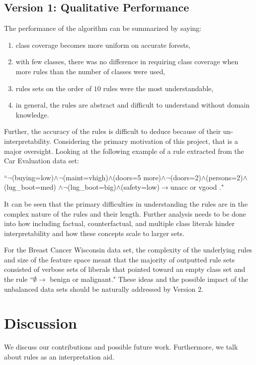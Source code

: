\documentclass[11pt]{article}
\begin{document}
\subsection{Version 1: Qualitative Performance}
The performance of the algorithm can be summarized by saying:
\begin{enumerate}
\item class coverage becomes more uniform on accurate forests,
\item with few classes, there was no difference in requiring class coverage when more rules than the number of classes were used, 
\item rules sets on the order of $10$ rules were the most understandable,
\item in general, the rules are abstract and difficult to understand without domain knowledge.
\end{enumerate}

Further, the accuracy of the rules is difficult to deduce because of their un-interpretability. Considering the primary motivation of this project, that is a major oversight. Looking at the following example of a rule extracted from the Car Evaluation data set: 
\begin{center}
``$\neg$(buying=low)$\land \neg$(maint=vhigh)$\land$(doors=5 more)$\land \neg$(doors=2)$\land$(persons=2)$\land$(lug\_boot=med) $\land \neg$(lug\_boot=big)$\land$(safety=low)$\longrightarrow$unacc or vgood  ."
\end{center}
It can be seen that the primary difficulties in understanding the rules are in the complex nature of the rules and their length. Further analysis needs to be done into how including factual, counterfactual, and multiple class literals hinder interpretability and how these concepts scale to larger sets.

For the Breast Cancer Wisconsin data set, the complexity of the underlying rules and size of the feature space meant that the majority of outputted rule sets consisted of verbose sets of liberals that pointed toward an empty class set and the rule ``$\emptyset \rightarrow $ benign or malignant." These ideas and the possible impact of the unbalanced data sets should be naturally addressed by Version 2.



\section{Discussion}
\label{sec:dis}
We discuss our contributions and possible future work. Furthermore, we talk about rules as an interpretation aid. 
\end{document}
